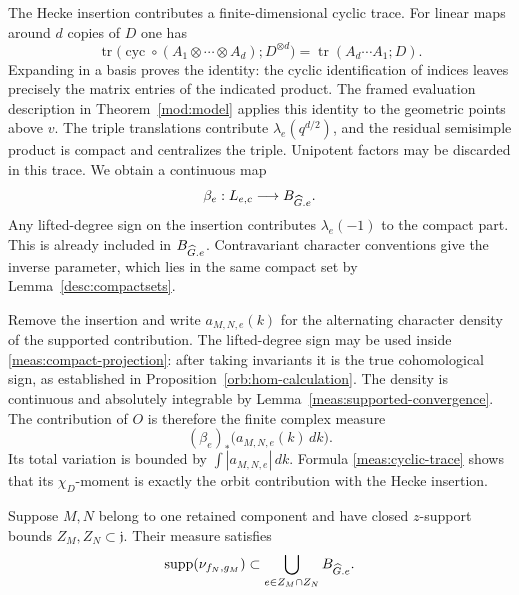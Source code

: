 The Hecke insertion contributes a finite-dimensional cyclic trace.  For
linear maps around $d$ copies of $D$ one has
\begin{equation}\label{meas:cyclic-trace}
 \operatorname{tr}\bigl(\operatorname{cyc}\circ
                      (A_1\otimes\cdots\otimes A_d);D^{\otimes d}\bigr)
 =\operatorname{tr}(A_d\cdots A_1;D).
\end{equation}
Expanding in a basis proves the identity: the cyclic identification of
indices leaves precisely the matrix entries of the indicated product.
The framed evaluation description in Theorem~\ref{mod:model} applies
this identity to the geometric points above $v$.  The triple translations
contribute $\lambda_e(q^{d/2})$, and the residual semisimple product is
compact and centralizes the triple.  Unipotent factors may be discarded
in this trace.  We obtain a continuous map
\begin{equation}\label{meas:parameter-map}
 \beta_e:L_{e,c}\longrightarrow B_{\widehat G.e}.
\end{equation}
Any lifted-degree sign on the insertion contributes
$\lambda_e(-1)$ to the compact part.  This is already included in
$B_{\widehat G.e}$.  Contravariant character conventions give the inverse
parameter, which lies in the same compact set by
Lemma~\ref{desc:compactsets}.

Remove the insertion and write $a_{M,N,e}(k)$ for the alternating character
density of the supported contribution.  The lifted-degree sign may be
used inside \eqref{meas:compact-projection}: after taking invariants it is
the true cohomological sign, as established in
Proposition~\ref{orb:hom-calculation}.  The density is continuous and
absolutely integrable by Lemma~\ref{meas:supported-convergence}.
The contribution of $O$ is therefore the finite complex measure
\begin{equation}\label{meas:orbit-measure}
 (\beta_e)_*\bigl(a_{M,N,e}(k)\,dk\bigr).
\end{equation}
Its total variation is bounded by $\int|a_{M,N,e}|\,dk$.  Formula
\eqref{meas:cyclic-trace} shows that its $\chi_D$-moment is exactly the
orbit contribution with the Hecke insertion.

\begin{proposition}\label{meas:common-support}
Suppose $M,N$ belong to one retained component and have closed
$z$-support bounds $Z_M,Z_N\subset\mathfrak j$.  Their measure satisfies
\begin{equation}\label{meas:common-support-bound}
 \operatorname{supp}(\nu_{f_N,g_M})
 \subset
 \bigcup_{e\in Z_M\cap Z_N}B_{\widehat G.e}.
\end{equation}
\end{proposition}

